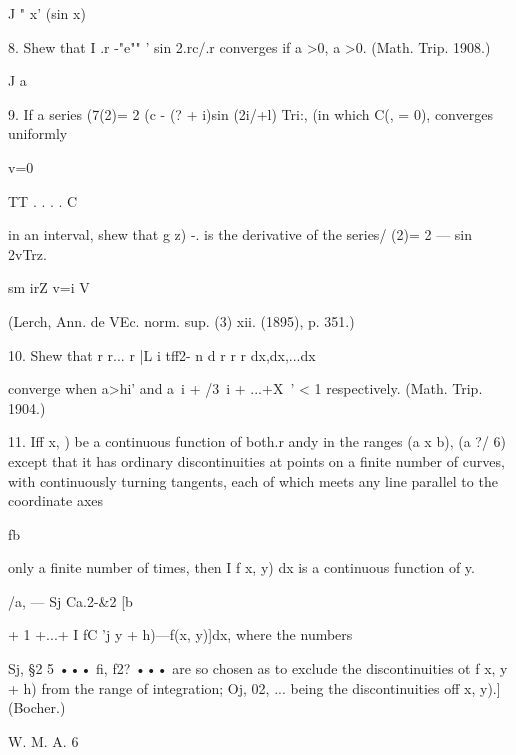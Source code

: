 J " x' (sin x)

8. Shew that I .r -"e"" ' sin 2.rc/.r converges if a >0, a >0. (Math.
Trip. 1908.)

J a

9. If a series (7(2)= 2 (c - (? + i)sin (2i/+l) Tri:, (in which C(, =
0), converges uniformly

v=0

TT . . . . C

in an interval, shew that g z) -. is the derivative of the series/
(2)= 2 — sin 2vTrz.

sm irZ v=i V

(Lerch, Ann. de VEc. norm. sup. (3) xii. (1895), p. 351.)

10. Shew that r r... r |L i tff2- n d r r r dx,dx,...dx

converge when a>hi' and a~i + /3~i + ...+X~' < 1 respectively. (Math.
Trip. 1904.)

11. Iff x, ) be a continuous function of both.r andy in the ranges (a
x b), (a ?/ 6) except that it has ordinary discontinuities at points
on a finite number of curves, with continuously turning tangents, each
of which meets any line parallel to the coordinate axes

fb

only a finite number of times, then I f x, y) dx is a continuous
function of y.

/a, — Sj Ca.2-\&2 [b

+ 1 +...+ I fC 'j y + h)—f(x, y)]dx, where the numbers

Sj, §2 5 ••• fi, f2? ••• are so chosen as to exclude the
discontinuities ot f x, y + h) from the range of integration; Oj, 02,
... being the discontinuities off x, y).] (Bocher.)

W. M. A. 6

